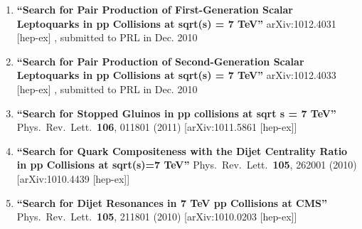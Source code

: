 \documentclass[10pt]{letter}
\begin{document}
\begin{enumerate}

\item%
{\bf ``Search for Pair Production of First-Generation Scalar Leptoquarks in pp Collisions at sqrt(s) = 7 TeV''}
  {}arXiv:1012.4031 [hep-ex] , submitted to PRL in Dec. 2010

\item%
{\bf ``Search for Pair Production of Second-Generation Scalar Leptoquarks in pp Collisions at sqrt(s) = 7 TeV''}
  {}arXiv:1012.4033 [hep-ex] , submitted to PRL in Dec. 2010

\item%
{\bf ``Search for Stopped Gluinos in pp collisions at sqrt s = 7 TeV''}
  {}Phys.\ Rev.\ Lett.\  {\bf 106}, 011801 (2011)
  [arXiv:1011.5861 [hep-ex]]

\item%
{\bf ``Search for Quark Compositeness with the Dijet Centrality Ratio in pp Collisions at sqrt(s)=7 TeV''}
  {}Phys.\ Rev.\ Lett.\  {\bf 105}, 262001 (2010)
  [arXiv:1010.4439 [hep-ex]]

\item%
{\bf ``Search for Dijet Resonances in 7 TeV pp Collisions at CMS''}
  {}Phys.\ Rev.\ Lett.\  {\bf 105}, 211801 (2010)
  [arXiv:1010.0203 [hep-ex]]





\end{enumerate}
\end{document}
